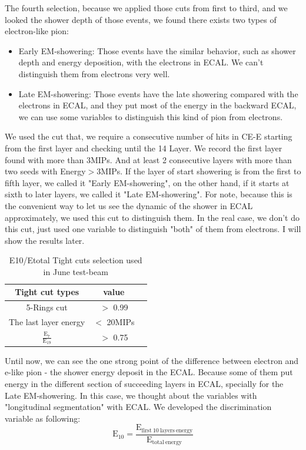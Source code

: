 The fourth selection, because we applied those cuts from first to third, and we looked the shower depth of those events, we found there exists two types of electron-like pion:
\begin{itemize}
\item Early EM-showering: Those events have the similar behavior, such as shower depth and energy deposition, with the electrons in ECAL. We can't distinguish them from electrons very well.
\item Late  EM-showering: Those events have the late showering compared with the electrons in ECAL, and they put most of the energy in the backward ECAL, we can use some variables to distinguish this kind of pion from electrons.
\end{itemize}
We used the cut that, we require a consecutive number of hits in CE-E starting from the first layer and checking until the 14 Layer. We record the first layer found with more than 3MIPs. And at least 2 consecutive layers with more than two seeds with Energy$>$3MIPs. If the layer of start showering is from the first to fifth layer, we called it "Early EM-showering", on the other hand, if it starts at sixth to later layers, we called it "Late EM-showering". For note, because this is the convenient way to let us see the dynamic of the shower in ECAL approximately, we used this cut to distinguish them. In the real case, we don't do this cut, just used one variable to distinguish "both" of them from electrons. I will show the results later. 

\begin{table}[h]%
    \centering
    \begin{tabular}{|c|c|c|}
    \hline
    Tight cut types & value\\\hline
    5-Rings cut &  $>$ 0.99 \\\hline  
    The last layer energy & $<$ 20MIPs \\\hline  
   $\mathrm{\frac{E_{7}}{E_{19}}}$& $>$ 0.75\\\hline  
        \end{tabular}
    \caption{E10/Etotal Tight cuts selection used in June test-beam}\label{basic_1}  %
\end{table}


Until now, we can see the one strong point of the difference between electron and e-like pion - the shower energy deposit in the ECAL. Because some of them put energy in the different section of succeeding layers in ECAL, specially for the Late EM-showering. In this case, we thought about the variables with "longitudinal segmentation" with ECAL. We developed the discrimination variable as following:
\begin{equation}
\mathrm{E_{10}=\frac{E_{\mathrm{first \ 10 \ layers \ energy}}}{E_{\mathrm{total \ energy}}}}
\end{equation}


